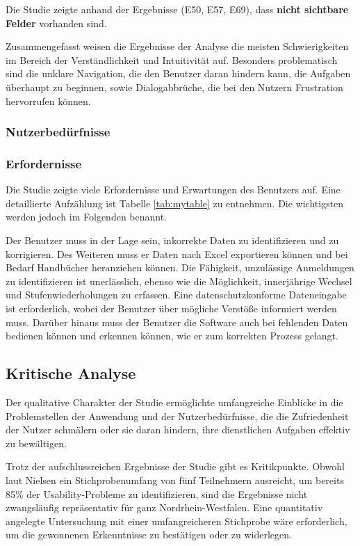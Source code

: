 Die Studie zeigte anhand der Ergebnisse (E50, E57, E69), dass \textbf{nicht sichtbare Felder} vorhanden sind.

Zusammengefasst weisen die Ergebnisse der Analyse die meisten Schwierigkeiten im Bereich der Verständlichkeit und Intuitivität auf. Besonders problematisch sind die unklare Navigation, die den Benutzer daran hindern kann, die Aufgaben überhaupt zu beginnen, sowie Dialogabbrüche, die bei den Nutzern Frustration hervorrufen können.

\subsubsection{Nutzerbedürfnisse}
\label{section-beduerfnisse}
\subsubsection{Erfordernisse}
Die Studie zeigte viele Erfordernisse und Erwartungen des Benutzers auf. Eine detaillierte Aufzählung ist Tabelle \ref{tab:mytable} zu entnehmen. Die wichtigsten werden jedoch im Folgenden benannt.

Der Benutzer muss in der Lage sein, inkorrekte Daten zu identifizieren und zu korrigieren. Des Weiteren muss er Daten nach Excel exportieren können und bei Bedarf Handbücher heranziehen können. Die Fähigkeit, unzulässige Anmeldungen zu identifizieren ist unerlässlich, ebenso wie die Möglichkeit, innerjährige Wechsel und Stufenwiederholungen zu erfassen. Eine datenschutzkonforme Dateneingabe ist erforderlich, wobei der Benutzer über mögliche Verstöße informiert werden muss. Darüber hinaus muss der Benutzer die Software auch bei fehlenden Daten bedienen können und erkennen können, wie er zum korrekten Prozess gelangt.

\subsection{Kritische Analyse}
Der qualitative Charakter der Studie ermöglichte umfangreiche Einblicke in die Problemstellen der Anwendung und der Nutzerbedürfnisse, die die Zufriedenheit der Nutzer schmälern oder sie daran hindern, ihre dienstlichen Aufgaben effektiv zu bewältigen. 

Trotz der aufschlussreichen Ergebnisse der Studie gibt es Kritikpunkte. Obwohl laut Nielsen ein Stichprobenumfang von fünf Teilnehmern ausreicht, um bereits 85\% der Usability-Probleme zu identifizieren\cite{Nielsen5Teilnehmer}, sind die Ergebnisse nicht zwangsläufig repräsentativ für ganz Nordrhein-Westfalen. Eine quantitativ angelegte Untersuchung mit einer umfangreicheren Stichprobe wäre erforderlich, um die gewonnenen Erkenntnisse zu bestätigen oder zu widerlegen.

